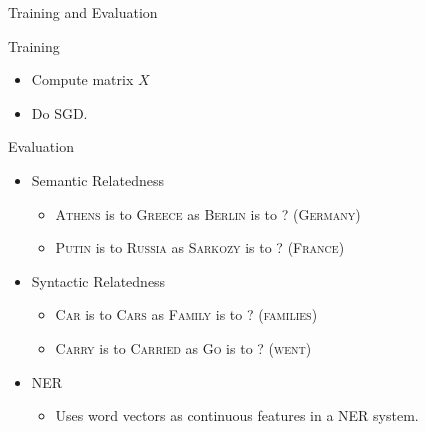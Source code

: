 
\begin{frame}{Training and Evaluation}

  \begin{exampleblock}{Training}
  \begin{itemize}[<+->]
  \item Compute matrix $X$
  \item Do SGD.
  \end{itemize}
  \end{exampleblock}
  
  \begin{exampleblock}{Evaluation}
  \begin{itemize}[<+->]
  \item Semantic Relatedness %
    \begin{itemize}
    \item \textsc{Athens} is to \textsc{Greece} as \textsc{Berlin} is to ? (\textsc{Germany})
    \item \textsc{Putin} is to \textsc{Russia} as \textsc{Sarkozy} is to ? (\textsc{France})
    \end{itemize}
  \item Syntactic Relatedness %
    \begin{itemize}
    \item \textsc{Car} is to \textsc{Cars} as \textsc{Family} is to ? (\textsc{families})
    \item \textsc{Carry} is to \textsc{Carried} as \textsc{Go} is to ? (\textsc{went})
    \end{itemize}
  \item NER 
    \begin{itemize}
    \item Uses word vectors as continuous features in a NER system.
    \end{itemize}
  \end{itemize}
  \end{exampleblock}
\end{frame}

